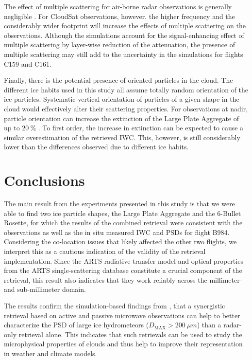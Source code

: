 \documentclass[journal abbreviation, manuscript]{copernicus}
\begin{document}
The effect of multiple scattering for air-borne radar observations is generally
negligible \citep{battaglia10}. For CloudSat observations, however, the higher
frequency and the considerably wider footprint will increase the effects of
multiple scattering on the observations. Although the simulations account for
the signal-enhancing effect of multiple scattering by layer-wise reduction of
the attenuation, the presence of multiple scattering may still add to the
uncertainty in the simulations for flights C159 and C161.

Finally, there is the potential presence of oriented particles in the cloud. The
different ice habits used in this study all assume totally random orientation of
the ice particles. Systematic vertical orientation of particles of a given shape
in the cloud would effectively alter their scattering properties. For
observations at nadir, particle orientation can increase the extinction of the
Large Plate Aggregate of up to $20\ \unit{\%}$ \citep{barlakas21}. To first
order, the increase in extinction can be expected to cause a similar
overestimation of the retrieved IWC. This, however, is still considerably lower
than the differences observed due to different ice habits.

\section{Conclusions}
\label{sec:conclusions}

The main result from the experiments presented in this study is that we were
able to find two ice particle shapes, the Large Plate Aggregate and the 6-Bullet
Rosette, for which the results of the combined retrieval were consistent with
the observations as well as the in situ measured IWC and PSDs for flight B984.
Considering the co-location issues that likely affected the other two flights,
we interpret this as a cautious indication of the validity of the retrieval
implementation. Since the ARTS radiative transfer model and optical properties
from the ARTS single-scattering database constitute a crucial component of the
retrieval, this result also indicates that they work reliably across the
millimeter- and sub-millimeter domain.

The results confirm the simulation-based findings from \citep{pfreundschuh20},
that a synergistic retrieval based on active and passive microwave observations
can help to better characterize the PSD of large ice hydrometeors ($D_\text{MAX}
> 200\ \unit{\mu m}$) than a radar-only retrieval alone. This indicates that
such retrievals can be used to study the microphysical properties of clouds and
thus help to improve their representation in weather and climate models.
\end{document}
